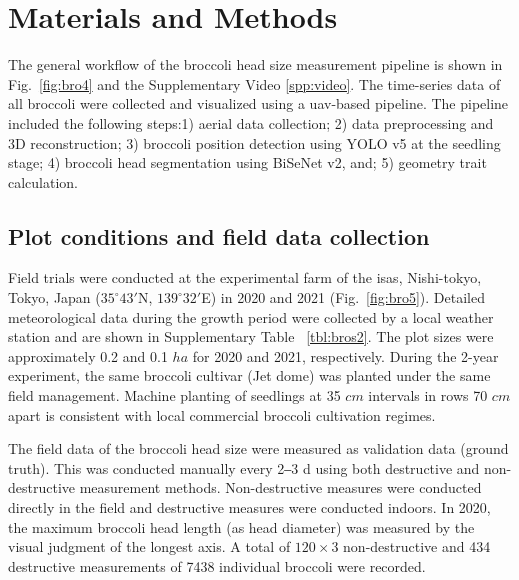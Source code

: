 \section{Materials and Methods}

The general workflow of the broccoli head size measurement pipeline is shown in Fig.~\ref{fig:bro4} and the Supplementary Video \ref{spp:video}. The time-series data of all broccoli were collected and visualized using a \gls{uav}-based pipeline. The pipeline included the following steps:1) aerial data collection; 2) data preprocessing and 3D reconstruction; 3) broccoli position detection using YOLO v5 at the seedling stage; 4) broccoli head segmentation using BiSeNet v2, and; 5) geometry trait calculation. 




\subsection{Plot conditions and field data collection}

Field trials were conducted at the experimental farm of the \gls{isas}, Nishi-tokyo, Tokyo, Japan ($35^\circ 43'$N, $139^\circ 32'$E) in 2020 and 2021 (Fig.~\ref{fig:bro5}). Detailed meteorological data during the growth period were collected by a local weather station and are shown in Supplementary Table ~\ref{tbl:bros2}. The plot sizes were approximately 0.2 and 0.1 $ha$ for 2020 and 2021, respectively. During the 2-year experiment, the same broccoli cultivar (Jet dome) was planted under the same field management. Machine planting of seedlings at 35 $cm$ intervals in rows 70 $cm$ apart is consistent with local commercial broccoli cultivation regimes. 



The field data of the broccoli head size were measured as validation data (ground truth). This was conducted manually every 2‒3 d using both destructive and non-destructive measurement methods. Non-destructive measures were conducted directly in the field and destructive measures were conducted indoors. In 2020, the maximum broccoli head length (as head diameter) was measured by the visual judgment of the longest axis. A total of $120 \times 3$ non-destructive and 434 destructive measurements of 7438 individual broccoli were recorded. 

